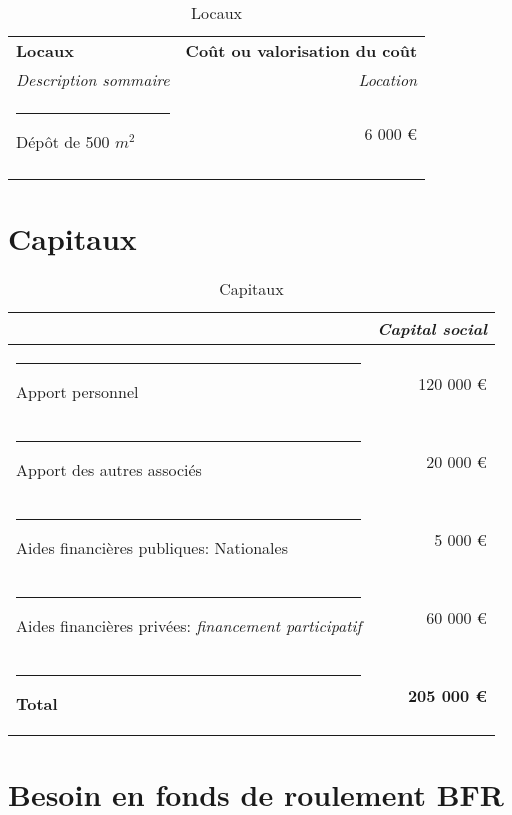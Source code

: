 \documentclass[12pt,a4paper]{report}
\begin{document}
		\begin{table}[h]
			\centering
			\caption{\color{green}Locaux}
			\vspace{0.5cm}
			\begin{tabular}{l|r}
				
				\textbf{Locaux} & \textbf{Coût ou valorisation du coût} \\
				\textit{Description sommaire} &  \textit{Location}  \\ \hline 
				\rule[0.5cm]{-0.1cm}{0cm}
				\color{green}Dépôt de 500 $m^2$  & 6 000 €   \\
				\color{black}
				
			\end{tabular}%
			\label{tab:addlabel}%
		\end{table}%
	\newpage
	\section{Capitaux}
		\begin{table}[h]
		  \centering
		  \caption{\color{green}Capitaux}
		    \begin{tabular}{l|r}
		    
		           & \textit{Capital social } \\ \hline
		     \rule[0.5cm]{-0.1cm}{0cm}
		    Apport personnel & 120 000 €   \\
			\rule[0.5cm]{-0.1cm}{0cm}
		    Apport des autres associés  &  20 000 € \\
			\rule[0.5cm]{-0.1cm}{0cm}
		    Aides financières publiques: Nationales & 5 000 €  \\
		    \rule[0.5cm]{-0.1cm}{0cm}
		    Aides financières privées: \textit{financement participatif} & 60 000 € \\ \hline
		    \rule[0.5cm]{-0.1cm}{0cm}
		    \textbf{\color{green}Total} & \textbf{\color{green}205 000 €}
		    
		    \end{tabular}%
		  \label{tab:addlabel}%
		\end{table}%
	
	\section{Besoin en fonds de roulement BFR}
	
\end{document}
